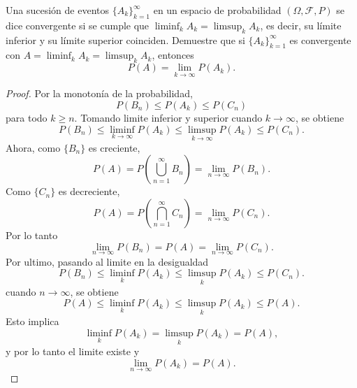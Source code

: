 \documentclass[12pt,a4paper]{article}
\newcommand{\paren}[1]{\left( #1 \right)}
\begin{document}
    \begin{mdframed}[style=mdbluebox,frametitle={Ejercicio 2}]
        Una sucesión de eventos $\{A_k\}_{k=1}^\infty$ en un espacio de probabilidad $(\Omega,\mathcal{F}, P)$ se dice convergente si se cumple que $\liminf_k A_k = \limsup_k A_k$, es decir, su límite inferior y su límite superior coinciden. Demuestre que si $\{A_k\}_{k=1}^\infty$ es convergente con $A = \liminf_k A_k = \limsup_k A_k$, entonces
        \[
        P(A) = \lim_{k \to \infty} P(A_k) .
        \]
    \end{mdframed}

    \begin{proof}
        Por la monotonía de la probabilidad,
        \begin{equation*}
            P(B_{n})\leq P(A_{k})\leq P(C_{n})
        \end{equation*}
        para todo $k\geq n$. Tomando limite inferior y superior cuando $k\to\infty$, se obtiene
        \begin{equation*}
            P(B_{n})\leq\liminf_{k\to\infty}P(A_{k})\leq\limsup_{k\to\infty} P(A_{k})\leq P(C_{n}).
        \end{equation*}
        Ahora, como $\{B_{n}\}$ es creciente,
        \begin{equation*}
            P(A)=P\paren{\bigcup_{n=1}^{\infty}B_{n}}=\lim_{n\to\infty}P(B_{n}).
        \end{equation*}
        Como $\{C_{n}\}$ es decreciente,
        \begin{equation*}
            P(A)=P\paren{\bigcap_{n=1}^{\infty}C_{n}}=\lim_{n\to\infty}P(C_{n}).
        \end{equation*}
        Por lo tanto
        \begin{equation*}
            \lim_{n\to\infty}P(B_{n})=P(A)=\lim_{n\to\infty}P(C_{n}).
        \end{equation*}
        Por ultimo, pasando al limite en la desigualdad
        \begin{equation*}
            P(B_{n})\leq\liminf_{k}P(A_{k})\leq\limsup_{k} P(A_{k})\leq P(C_{n}).
        \end{equation*}
        cuando $n\to\infty$, se obtiene
        \begin{equation*}
            P(A)\leq\liminf_{k}P(A_{k})\leq\limsup_{k} P(A_{k})\leq P(A).
        \end{equation*}
        Esto implica
        \begin{equation*}
            \liminf_{k}P(A_{k})=\limsup_{k}P(A_{k})=P(A),
        \end{equation*}
        y por lo tanto el limite existe y
        \begin{equation*}
            \lim_{n\to\infty}P(A_{k})=P(A).
        \end{equation*}
    \end{proof}
\end{document}
